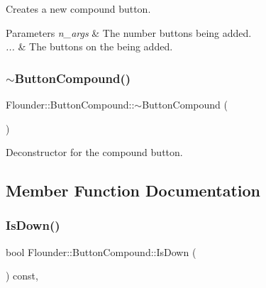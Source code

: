 Creates a new compound button. 


\begin{DoxyParams}{Parameters}
{\em n\+\_\+args} & The number buttons being added. \\
\hline
{\em ...} & The buttons on the being added. \\
\hline
\end{DoxyParams}
\mbox{\label{class_flounder_1_1_button_compound_a5331cca1659eea63029b6522bfde408b}} 
\subsubsection{\texorpdfstring{$\sim$\+Button\+Compound()}{~ButtonCompound()}}
{\footnotesize\ttfamily Flounder\+::\+Button\+Compound\+::$\sim$\+Button\+Compound (\begin{DoxyParamCaption}{ }\end{DoxyParamCaption})}



Deconstructor for the compound button. 



\subsection{Member Function Documentation}
\mbox{\label{class_flounder_1_1_button_compound_a168866bc6410f111f9c8a98b1ec83dd6}} 
\subsubsection{\texorpdfstring{Is\+Down()}{IsDown()}}
{\footnotesize\ttfamily bool Flounder\+::\+Button\+Compound\+::\+Is\+Down (\begin{DoxyParamCaption}{ }\end{DoxyParamCaption}) const\hspace{0.3cm}{\ttfamily [override]}, {\ttfamily [virtual]}}



